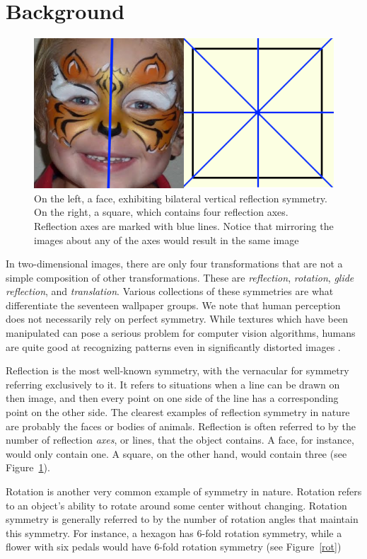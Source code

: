 \section{Background}
\begin{figure}
\centering
\includegraphics[width=0.9\columnwidth]{reflection}
\caption{On the left, a face, exhibiting bilateral vertical reflection symmetry. On the right, a square, which contains four reflection axes. Reflection axes are marked with blue lines. Notice that mirroring the images about any of the axes would result in the same image}
\label{ref}
\end{figure}

In two-dimensional images, there are only four transformations that are not a simple composition of other transformations. These are \textit{reflection}, \textit{rotation}, \textit{glide reflection}, and \textit{translation}. Various collections of these symmetries are what differentiate the seventeen wallpaper groups. We note that human perception does not necessarily rely on perfect symmetry. While textures which have been manipulated can pose a serious problem for computer vision algorithms, humans are quite good at recognizing patterns even in significantly distorted images \cite{nearregular}.  

Reflection is the most well-known symmetry, with the vernacular for symmetry referring exclusively to it. It refers to situations when a line can be drawn on then image, and then every point on one side of the line has a corresponding point on the other side. The clearest examples of reflection symmetry in nature are probably the faces or bodies of animals. Reflection is often referred to by the number of reflection \textit{axes}, or lines, that the object contains. A face, for instance, would only contain one. A square, on the other hand, would contain three (see Figure~\ref{ref}).

Rotation is another very common example of symmetry in nature. Rotation refers to an object's ability to rotate around some center without changing. Rotation symmetry is generally referred to by the number of rotation angles that maintain this symmetry. For instance, a hexagon has 6-fold rotation symmetry, while a flower with six pedals would have 6-fold rotation symmetry (see Figure~\ref{rot})

